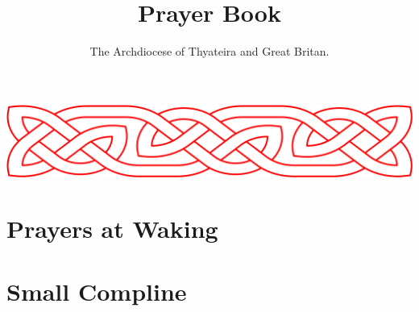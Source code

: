 \documentclass[8pt]{extarticle}
\title{Prayer Book}
\author{The Archdiocese of Thyateira and Great Britan.}
\begin{document}



\maketitle
\pagebreak
\tableofcontents
\pagebreak
\includegraphics[width=1\textwidth]{assets/celtic-knot-banner.png}
\section{Prayers at Waking}

\pagebreak
\section{Small Compline}

\pagebreak
\end{document}
